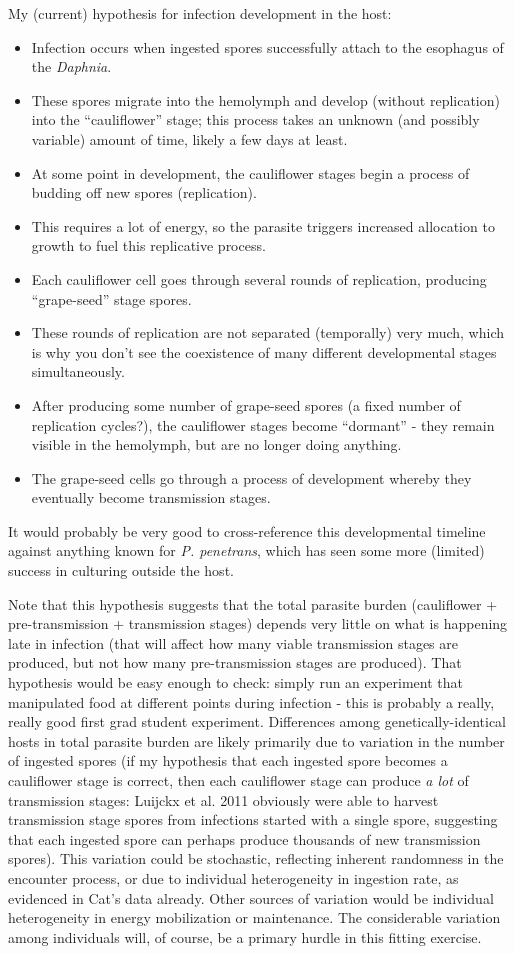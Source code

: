 \documentclass[11pt,reqno,final,pdftex]{amsart}\usepackage[]{graphicx}\usepackage[]{color}
\theoremstyle{plain}
\numberwithin{equation}{part}
\begin{document}
My (current) hypothesis for infection development in the host:
\begin{itemize}
\item Infection occurs when ingested spores successfully attach to the esophagus of the \emph{Daphnia}.
\item These spores migrate into the hemolymph and develop (without replication) into the ``cauliflower'' stage; this process takes an unknown (and possibly variable) amount of time, likely a few days at least.
\item At some point in development, the cauliflower stages begin a process of budding off new spores (replication).
\item This requires a lot of energy, so the parasite triggers increased allocation to growth to fuel this replicative process.
\item Each cauliflower cell goes through several rounds of replication, producing ``grape-seed'' stage spores.
\item These rounds of replication are not separated (temporally) very much, which is why you don't see the coexistence of many different developmental stages simultaneously.
\item After producing some number of grape-seed spores (a fixed number of replication cycles?), the cauliflower stages become ``dormant'' - they remain visible in the hemolymph, but are no longer doing anything.
\item The grape-seed cells go through a process of development whereby they eventually become transmission stages.
\end{itemize}
It would probably be very good to cross-reference this developmental timeline against anything known for \emph{P. penetrans}, which has seen some more (limited) success in culturing outside the host.

Note that this hypothesis suggests that the total parasite burden (cauliflower + pre-transmission + transmission stages) depends very little on what is happening late in infection (that will affect how many viable transmission stages are produced, but not how many pre-transmission stages are produced).
That hypothesis would be easy enough to check: simply run an experiment that manipulated food at different points during infection - this is probably a really, really good first grad student experiment.
Differences among genetically-identical hosts in total parasite burden are likely primarily due to variation in the number of ingested spores (if my hypothesis that each ingested spore becomes a cauliflower stage is correct, then each cauliflower stage can produce \emph{a lot} of transmission stages: Luijckx et al. 2011 obviously were able to harvest transmission stage spores from infections started with a single spore, suggesting that each ingested spore can perhaps produce thousands of new transmission spores).
This variation could be stochastic, reflecting inherent randomness in the encounter process, or due to individual heterogeneity in ingestion rate, as evidenced in Cat's data already.
Other sources of variation would be individual heterogeneity in energy mobilization or maintenance.
The considerable variation among individuals will, of course, be a primary hurdle in this fitting exercise.
\end{document}
